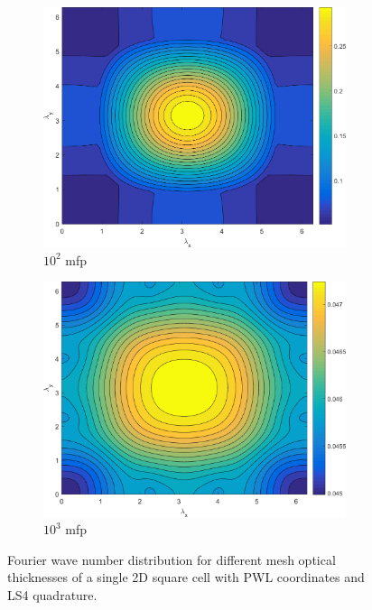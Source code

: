 \begin{figure}
{\begin{subfigure}[b]{0.485\textwidth}
		\centering
		\includegraphics[width=0.975\textwidth]{figures/sec_DSA/SI_MIP_C=4_UPWLD1_LS4_x=100_dydx=1_contour.png}
		\caption{$10^{2}$ mfp}
	\end{subfigure}
	\hfill
	\begin{subfigure}[b]{0.485\textwidth}
		\centering
		\includegraphics[width=0.975\textwidth]{figures/sec_DSA/SI_MIP_C=4_UPWLD1_LS4_x=1000_dydx=1_contour.png}
		\caption{$10^{3}$ mfp}
	\end{subfigure}
	}
\caption{Fourier wave number distribution for different mesh optical thicknesses of a single 2D square cell with PWL coordinates and LS4 quadrature.}
\label{fig::2D_homo_dsa_wave_LS4}
\end{figure}

